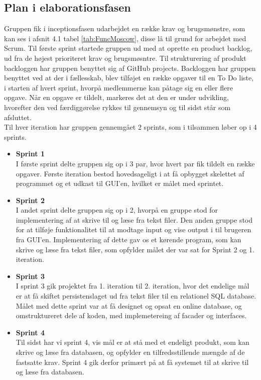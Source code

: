 \subsection{Plan i elaborationsfasen}
Gruppen fik i inceptionsfasen udarbejdet en række krav og brugsmønstre, som kan ses i afsnit 4.1 tabel \ref{tab:FuncMoscow}, disse lå til grund for arbejdet med Scrum. Til første sprint startede gruppen ud med at oprette en product backlog, ud fra de højest prioriteret krav og brugsmøsntre. Til strukturering af produkt backloggen har gruppen benyttet sig af GitHub projects. Backloggen har gruppen benyttet ved at der i fællesskab, blev tilføjet en række opgaver til en To Do liste, i starten af hvert sprint, hvorpå medlemmerne kan påtage sig en eller flere opgave. Når en opgave er tildelt, markeres det at den er under udvikling, hvorefter den ved færdiggørelse rykkes til gennemsyn og til sidst står som afsluttet. \\
Til hver iteration har gruppen gennemgået 2 sprints, som i tilsammen løber op i 4 sprints. 
\begin{itemize}
    \item \textbf{Sprint 1} \\
    I første sprint delte gruppen sig op i 3 par, hvor hvert par fik tildelt en række opgaver. Første iteration bestod hovedsageligt i at få opbygget skelettet af programmet og et udkast til GUI'en, hvilket er målet med sprintet. 
    \item \textbf{Sprint 2} \\
    I andet sprint delte gruppen sig op i 2, hvorpå en gruppe stod for implementering af at skrive til og læse fra tekst filer. Den anden gruppe stod for at tilføje funktionalitet til at modtage input og vise output i til brugeren fra GUI'en. Implementering af dette gav os et kørende program, som kan skrive og læse fra tekst filer, som opfylder målet der var sat for Sprint 2 og 1. iteration.
    \item \textbf{Sprint 3} \\
    I sprint 3 gik projektet fra 1. iteration til 2. iteration, hvor det endelige mål er at få skiftet persistenslaget ud fra tekst filer til en relationel SQL database. Målet med dette sprint var at få designet og opsat en online database, og omstruktureret dele af koden, med implemetereing af facader og interfaces. 
    \item \textbf{Sprint 4}\\
    Til sidst har vi sprint 4, vis mål er at stå med et endeligt produkt, som kan skrive og læse fra databasen, og opfylder en tilfredsstillende mængde af de fastsatte krav. Sprint 4 gik derfor primært på at få systemet til at skrive til og læse fra databasen. 
\end{itemize}